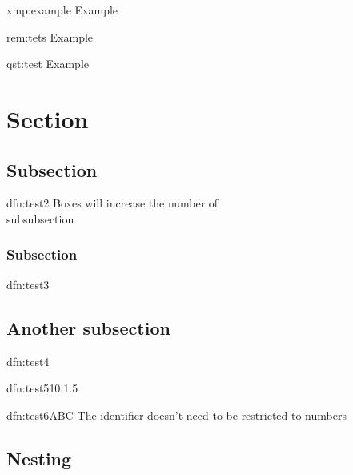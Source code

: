 \documentclass[]{article}
\begin{document}
\begin{xmp}[Example]{xmp:example}{}
    Example
\end{xmp}

\begin{rem}[Example]{rem:tets}{}
    Example
\end{rem}

\begin{qst}[Example]{qst:test}{}
    Example
\end{qst}

\newpage

\section{Section}
\subsection{Subsection}
\begin{dfn}{dfn:test2}{}
    Boxes will increase the number of \\subsubsection
\end{dfn}

\subsubsection{Subsection}

\begin{dfn}{dfn:test3}{}

\end{dfn}

\subsection{Another subsection}

\begin{dfn}{dfn:test4}{}

\end{dfn}

\begin{dfn}{dfn:test5}{10.1.5}

\end{dfn}

\begin{dfn}{dfn:test6}{ABC}
    The identifier doesn't need to be restricted to numbers
\end{dfn}

\newpage
\subsection{Nesting}
\end{document}
